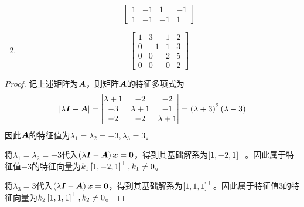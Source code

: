 \begin{problem}
\begin{enumerate}
\begin{equation*}
\begin{bmatrix}
                  1 & -1 & 1  & -1 \\
                  1 & -1 & -1 & 1
              \end{bmatrix}
          \end{equation*}
    \item \begin{equation*}
              \begin{bmatrix}
                  1 & 3  & 1 & 2 \\
                  0 & -1 & 1 & 3 \\
                  0 & 0  & 2 & 5 \\
                  0 & 0  & 0 & 2
              \end{bmatrix}
          \end{equation*}
\end{enumerate}
\end{problem}
\begin{proof}
    记上述矩阵为\(\boldsymbol{A}\)，则矩阵\(\boldsymbol{A}\)的特征多项式为
    \begin{equation*}
        \left|\lambda\boldsymbol{I}-\boldsymbol{A} \right| =
        \begin{vmatrix}
            \lambda+1 & -2        & -2        \\
            -3        & \lambda+1 & -1        \\
            -2        & -2        & \lambda+1
        \end{vmatrix}=\left( \lambda+3 \right)^2\left( \lambda-3 \right)
    \end{equation*}
    因此\(\boldsymbol{A}\)的特征值为\(\lambda_1=\lambda_2=-3,\lambda_3=3\)。

    将\(\lambda_1=\lambda_2=-3\)代入\(\left( \lambda\boldsymbol{I}-\boldsymbol{A} \right)\boldsymbol{x}=\boldsymbol{0}\)，得到其基础解系为\(\left[ 1,-2,1 \right]^\top\)。因此属于特征值\(-3\)的特征向量为\(k_1\left[ 1,-2,1 \right]^\top,k_1\neq0\)。

    将\(\lambda_3=3\)代入\(\left( \lambda\boldsymbol{I}-\boldsymbol{A} \right)\boldsymbol{x}=\boldsymbol{0}\)，得到其基础解系为\(\left[ 1,1,1 \right]^\top\)。因此属于特征值\(3\)的特征向量为\(k_2\left[ 1,1,1 \right]^\top,k_2\neq0\)。
\end{proof}

